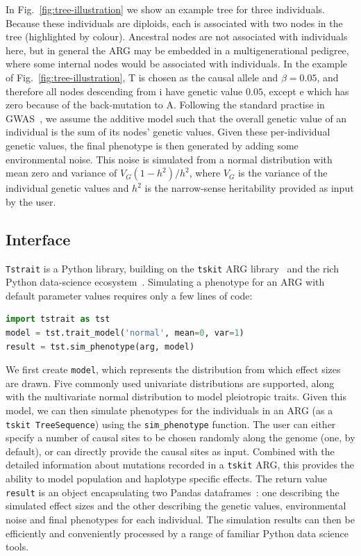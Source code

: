 \documentclass[unnumsec,webpdf,modern,large,namedate]{oup-authoring-template}%
\begin{document}
In Fig.~\ref{fig:tree-illustration} we show an example
tree for three individuals.
Because these individuals are diploids, each is associated
with two nodes in the tree (highlighted by colour).
Ancestral nodes are not associated with individuals here,
but in general the ARG may be embedded in a multigenerational
pedigree, where some internal nodes would be associated
with individuals.
In the example of
Fig.~\ref{fig:tree-illustration}, T is chosen as the causal
allele and $\beta=0.05$, and
therefore all nodes descending from \textsf{i}
have genetic value $0.05$, except \textsf{e} which
has zero because of the back-mutation to A.
Following the standard practise in GWAS~\citep{uffelmann2021},
we assume the additive model such that the overall
genetic value of an individual is the sum of its
nodes' genetic values.
Given these per-individual genetic values, the final phenotype
is then generated by adding some environmental noise.
This noise is simulated from a normal distribution with mean zero
and variance of $V_G(1-h^2)/{h^2}$,
where $V_G$ is the variance of the individual genetic values
and $h^2$ is the narrow-sense heritability provided as input by the user.

\subsection{Interface}
\texttt{Tstrait} is a Python library, building on the \texttt{tskit}
ARG library~\citep{ralph2020,wong2023general} and the rich
Python data-science ecosystem~\citep{numpy}.
Simulating a phenotype for an ARG with default parameter
values requires only a few lines of code:
\begin{lstlisting}[language=Python]
import tstrait as tst
model = tst.trait_model('normal', mean=0, var=1)
result = tst.sim_phenotype(arg, model)
\end{lstlisting}
We first create \texttt{model}, which represents the distribution
from which effect sizes are drawn. Five commonly used
univariate distributions are supported, along with the
multivariate normal distribution to model pleiotropic traits.
Given this model, we can then simulate phenotypes for the individuals
in an ARG (as a  \texttt{tskit TreeSequence}) using the
\texttt{sim\_phenotype} function.
The user can either specify a number of causal sites to be chosen randomly
along the genome (one, by default), or can directly provide the causal
sites as input. Combined with the detailed information about
mutations recorded in a \texttt{tskit} ARG, this provides the ability
to model population and haplotype specific effects.
The return value \texttt{result} is an object encapsulating
two Pandas dataframes~\citep{mckinney2010data}: one describing the simulated
effect sizes and the other describing the genetic values,
environmental noise and final phenotypes for each individual.
The simulation results can then be efficiently and conveniently
processed by a range of familiar Python data science tools.
\end{document}
